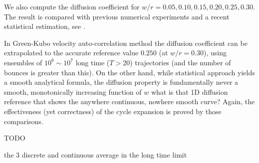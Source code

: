 We also compute the diffusion coefficient for $w/r = 0.05, 0.10, 0.15,
0.20, 0.25, 0.30$. The result is compared with previous
numerical experiments and a recent statistical estimation, see
.

In Green-Kubo velocity auto-correlation method the  diffusion
coefficient can be extrapolated to the accurate reference value
$0.250$ (at $w/r=0.30$), using ensembles of $10^6\sim10^7$ long time ($T>20$)
trajectories (and the number of bounces is
greater than this). On the other hand, while statistical
approach yields a smooth analytical formula, the
diffusion property is fundamentally never a smooth, monotonically
increasing function of $w$
     {what is that 1D diffusion reference that shows the
    anywhere continuous, nowhere smooth curve?}
Again, the effectiveness (yet correctness) of the cycle expansion is
proved by those comparisons.

TODO

the 3 discrete and continuous average in the long time limit

